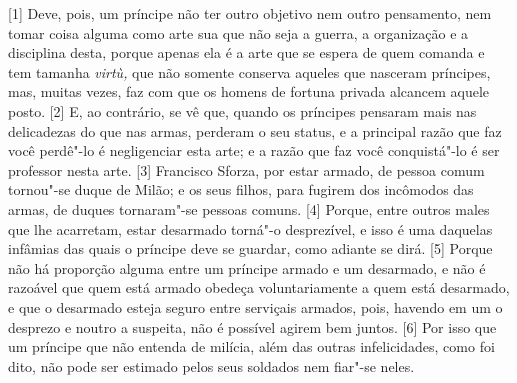 {[}1{]} Deve, pois, um príncipe não ter outro objetivo nem outro
pensamento, nem tomar coisa alguma como arte sua que não seja a guerra,
a organização e a disciplina desta, porque apenas ela é a arte que se
espera de quem comanda e tem tamanha \emph{virtù,} que não somente
conserva aqueles que nasceram príncipes, mas, muitas vezes, faz com que
os homens de fortuna privada alcancem aquele posto. {[}2{]} E, ao
contrário, se vê que, quando os príncipes pensaram mais nas delicadezas
do que nas armas, perderam o seu status, e a principal razão que faz
você perdê"-lo é negligenciar esta arte; e a razão que faz você
conquistá"-lo é ser professor nesta arte. {[}3{]} Francisco Sforza, por
estar armado, de pessoa comum tornou"-se duque de Milão; e os seus
filhos, para fugirem dos incômodos das
armas, de duques tornaram"-se pessoas comuns. {[}4{]} Porque, entre
outros males que lhe acarretam, estar desarmado torná"-o desprezível, e
isso é uma daquelas infâmias das quais o príncipe deve se guardar, como
adiante se dirá. {[}5{]} Porque não há
proporção alguma entre um príncipe armado e um desarmado, e não é
razoável que quem está armado obedeça voluntariamente a quem está
desarmado, e que o desarmado esteja seguro entre serviçais armados,
pois, havendo em um o desprezo e noutro a suspeita, não é possível
agirem bem juntos. {[}6{]} Por isso que um príncipe que não entenda de
milícia, além das outras infelicidades, como foi dito, não pode ser
estimado pelos seus soldados nem fiar"-se neles.

